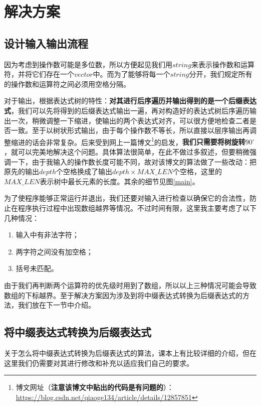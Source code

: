 \documentclass[UTF8]{ctexart}
\begin{document}
	
	\section{解决方案}
		\subsection{设计输入输出流程}\label{input and output}
		\indent 因为考虑到操作数可能是多位数，所以方便起见我们用$string$来表示操作数和运算符，并将它们存在一个$vector$中。而为了能够将每一个$string$分开，我们规定所有的操作数和运算符之间必须用空格分隔。
		
		\indent 对于输出，根据表达式树的特性：\textbf{对其进行后序遍历并输出得到的是一个后缀表达式}，我们可以先将得到的后缀表达式输出一遍，再对构造好的表达式树后序遍历输出一次，稍微调整一下缩进，使输出的两个表达式对齐，可以很方便地检查二者是否一致。至于以树状形式输出，由于每个操作数不等长，所以直接以层序输出再调整缩进的话会非常复杂。后来受到网上一篇博文\footnote{博文网址（\textbf{注意该博文中贴出的代码是有问题的}）：\url{https://blog.csdn.net/qiaoge134/article/details/12857851}}的启发，\textbf{我们只需要将树旋转$90^{\circ}$}，就可以完美地解决这个问题。具体算法很简单，在此不做过多叙述，但要稍微强调一下，由于我输入的操作数长度可能不同，故对该博文的算法做了一些改动：把原先的输出$depth$个空格换成了输出$depth \times MAX\_LEN$个空格，这里的$MAX\_LEN$表示树中最长元素的长度。其余的细节见图\ref{main}。
		
		\indent 为了使程序能够正常运行并退出，我们还要对输入进行检查以确保它的合法性，防止在程序执行过程中出现数组越界等情况。不过时间有限，这里我主要考虑了以下几种情况：
		\begin{enumerate}
			\item 输入中有非法字符；
			\item 两字符之间没有加空格；
			\item 括号未匹配。
		\end{enumerate}
	
		\indent 由于我们再判断两个运算符的优先级时用到了数组，所以以上三种情况可能会导致数组的下标越界。至于解决方案因为涉及到将中缀表达式转换为后缀表达式的方法，我们放在下一节中介绍。
	
		\subsection{将中缀表达式转换为后缀表达式}\label{fun to RPN}
		
		\indent 关于怎么将中缀表达式转换为后缀表达式的算法，课本\cite{data_structure}上有比较详细的介绍，但在这里我们仍需要对其进行修改和补充以适应我们自己的要求。
		
\end{document}

